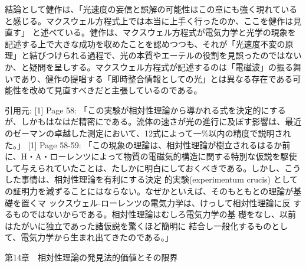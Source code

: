 \documentclass{article}
\begin{document}
結論として健作は、「光速度の妄信と誤解の可能性はこの章にも強く現れていると感じる。マクスウェル方程式上では本当に上手く行ったのか、ここを健作は見直す」 と述べている。健作は、マクスウェル方程式が電気力学と光学の現象を記述する上で大きな成功を収めたことを認めつつも、それが「光速度不変の原理」と結びつけられる過程で、光の本質やエーテルの役割を見誤ったのではないか、と疑問を呈しする。マクスウェル方程式が記述するのは「電磁波」の振る舞いであり、健作の提唱する「即時整合情報としての光」とは異なる存在である可能性を改めて見直すべきだと主張しているのである。

引用元:
[1] Page 58: 「この実験が相対性理論から導かれる式を決定的にするが、しかもはなはだ精密にである。流体の速さが光の進行に及ぼす影響は、最近のゼーマンの卓越した測定において、12式によって一\%以内の精度で説明された。」
[1] Page 58-59: 「この現象の理論は、相対性理論が樹立されるはるか前に、H・A・ローレンツによって物質の電磁気的構造に関する特別な仮説を駆使して与えられていたことは、たしかに明白にしておくべきである。しかし、こうした事情は、相対性理論を有利にする決定 的実験(experimentum crucis) としての証明力を減ずることにはならない。なぜかといえば、そのもともとの理論が基礎を置くマ ックスウェル-ローレンツの電気力学は、けっして相対性理論に反 するものではないからである。相対性理論はむしろ電気力学の基 礎をなし、以前はたがいに独立であった諸仮説を驚くほど簡明に 結合し一般化するものとして、電気力学から生まれ出てきたのである。」



第14章　相対性理論の発見法的価値とその限界
\end{document}
